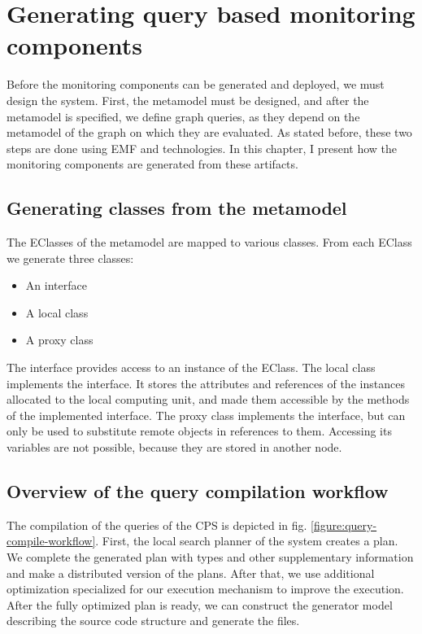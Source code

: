 \chapter{Generating query based monitoring components}

Before the monitoring components can be generated and deployed, we must design the system.
First, the metamodel must be designed, and after the metamodel is specified, we define graph queries, as they depend on the metamodel of the graph on which they are evaluated. 
As stated before, these two steps are done using EMF and \viatra{} technologies.
In this chapter, I present how the monitoring components are generated from these artifacts. 

\section{Generating classes from the metamodel}

The EClasses of the metamodel are mapped to various \cpp{} classes.
From each EClass we generate three \cpp{} classes:

\begin{itemize}
	\item An interface
	\item A local class
	\item A proxy class
\end{itemize}

The interface provides access to an instance of the EClass. 
The local class implements the interface. It stores the attributes and references of the instances allocated to the local computing unit, and made them accessible by the methods of the implemented interface.
The proxy class implements the interface, but can only be used to substitute remote objects in references to them. 
Accessing its variables are not possible, because they are stored in another node. 

\section{Overview of the query compilation workflow}

The compilation of the queries of the CPS is depicted in fig. \ref{figure:query-compile-workflow}. 
First, the local search planner of the \viatra{} system creates a plan. 
We complete the generated plan with types and other supplementary information and make a distributed version of the plans. 
After that, we use additional optimization specialized for our execution mechanism to improve the execution. 
After the fully optimized plan is ready, we can construct the generator model describing the source code structure and generate the \cpp{} files.

